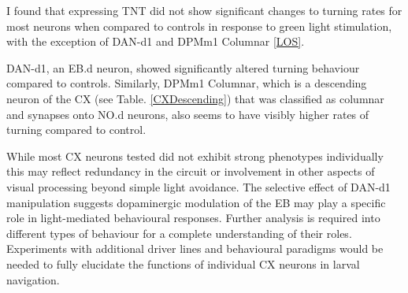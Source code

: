      \begin{table}[H]
    \centering
    \caption{ \textbf{Neurons tested for LOF} Neuron names, corresponding split GAL4 line used for LOF experiments, and lineage information.}
    \label{TNTlines}
    \end{table}

    I found that expressing TNT did not show significant changes to turning rates for most neurons when compared to controls in response to green light stimulation, with the exception of DAN-d1 and DPMm1 Columnar \ref{LOS}. 

    DAN-d1, an EB.d neuron, showed significantly altered turning behaviour compared to controls. 
    Similarly, DPMm1 Columnar, which is a descending neuron of the CX (see Table. \ref{CXDescending}) that was classified as columnar and synapses onto NO.d neurons,  also seems to have visibly higher rates of turning compared to control. 
    
    While most CX neurons tested did not exhibit strong phenotypes individually this may reflect redundancy in the circuit or involvement in other aspects of visual processing beyond simple light avoidance. The selective effect of DAN-d1 manipulation suggests dopaminergic modulation of the EB may play a specific role in light-mediated behavioural responses. Further analysis is required into different types of behaviour for a complete understanding of their roles. Experiments with additional driver lines and behavioural paradigms would be needed to fully elucidate the functions of individual CX neurons in larval navigation.


